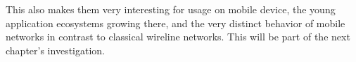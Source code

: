 This also makes them very interesting for usage on mobile device, the young application ecosystems growing there, and the very distinct behavior of mobile networks in contrast to classical wireline networks. This will be part of the next chapter's investigation.




%

 
 

